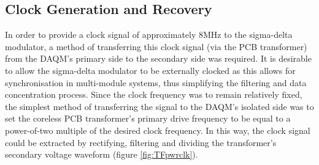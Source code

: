 \documentclass[conference]{IEEEtran}
\begin{document}
	\subsection{Clock Generation and Recovery}
	In order to provide a clock signal of approximately 8MHz to the sigma-delta modulator, a method of transferring this clock signal (via the PCB transformer) from the DAQM's primary side to the secondary side was required.  It is desirable to allow the sigma-delta modulator to be externally clocked as this allows for synchronisation in multi-module systems, thus simplifying the filtering and data concentration process.  Since the clock frequency was to remain relatively fixed, the simplest method of transferring the signal to the DAQM's isolated side was to set the coreless PCB transformer's primary drive frequency to be equal to a power-of-two multiple of the desired clock frequency.  In this way, the clock signal could be extracted by rectifying, filtering and dividing the transformer's secondary voltage waveform (figure \ref{fig:TFpwrclk}).
	
\end{document}
